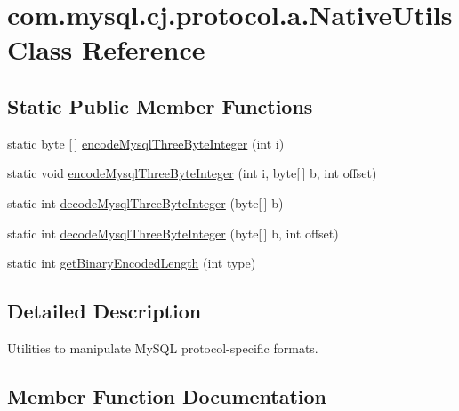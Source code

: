 \hypertarget{classcom_1_1mysql_1_1cj_1_1protocol_1_1a_1_1_native_utils}{}\section{com.\+mysql.\+cj.\+protocol.\+a.\+Native\+Utils Class Reference}
\label{classcom_1_1mysql_1_1cj_1_1protocol_1_1a_1_1_native_utils}
\subsection*{Static Public Member Functions}
\begin{DoxyCompactItemize}
\item 
static byte \mbox{[}$\,$\mbox{]} \mbox{\hyperlink{classcom_1_1mysql_1_1cj_1_1protocol_1_1a_1_1_native_utils_a219c3474ed3459976b78e6db24078981}{encode\+Mysql\+Three\+Byte\+Integer}} (int i)
\item 
static void \mbox{\hyperlink{classcom_1_1mysql_1_1cj_1_1protocol_1_1a_1_1_native_utils_a5965327577eb5373eba1db4543ab62d7}{encode\+Mysql\+Three\+Byte\+Integer}} (int i, byte\mbox{[}$\,$\mbox{]} b, int offset)
\item 
static int \mbox{\hyperlink{classcom_1_1mysql_1_1cj_1_1protocol_1_1a_1_1_native_utils_a6908531afd3be465ad595bbbf4bd7926}{decode\+Mysql\+Three\+Byte\+Integer}} (byte\mbox{[}$\,$\mbox{]} b)
\item 
static int \mbox{\hyperlink{classcom_1_1mysql_1_1cj_1_1protocol_1_1a_1_1_native_utils_aa4d8ecb6bae28aac66f4a6fd53e88cd7}{decode\+Mysql\+Three\+Byte\+Integer}} (byte\mbox{[}$\,$\mbox{]} b, int offset)
\item 
static int \mbox{\hyperlink{classcom_1_1mysql_1_1cj_1_1protocol_1_1a_1_1_native_utils_ac3519c674780b347ccf3b3e4a4c00193}{get\+Binary\+Encoded\+Length}} (int type)
\end{DoxyCompactItemize}


\subsection{Detailed Description}
Utilities to manipulate My\+S\+QL protocol-\/specific formats. 

\subsection{Member Function Documentation}
\mbox{\label{classcom_1_1mysql_1_1cj_1_1protocol_1_1a_1_1_native_utils_a6908531afd3be465ad595bbbf4bd7926}} 
